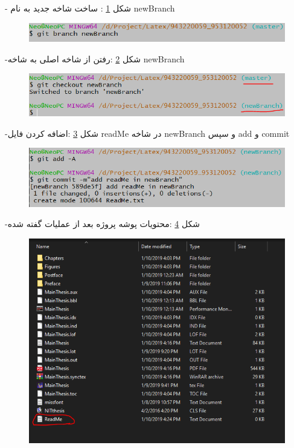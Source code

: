 - شکل \ref{n1} : ساخت شاخه جدید به نام newBranch
\begin{figure}[tbh]
	\centering
	\includegraphics[width=1\textwidth]{./Figures/n1}
	\caption{ }
	\label{n1}
\end{figure}



-شکل \ref{n2} :رفتن از شاخه اصلی به شاخه newBranch
\begin{figure}[tbh]
	\centering
	\includegraphics[width=1\textwidth]{./Figures/n2}
	\caption{  }
	\label{n2}
\end{figure}


-شکل \ref{n3} :اضافه کردن فایل readMe در شاخه newBranch و سپس add و commit
\begin{figure}[tbh]
	\centering
	\includegraphics[width=1\textwidth]{./Figures/n3}
	\caption{  }
	\label{n3}
\end{figure}
\newpage


-شکل \ref{n4} :محتویات پوشه پروژه بعد از عملیات گفته شده
\begin{figure}[tbh]
	\centering
	\includegraphics[width=1\textwidth]{./Figures/n4}
	\caption{  }
	\label{n4}
\end{figure}

